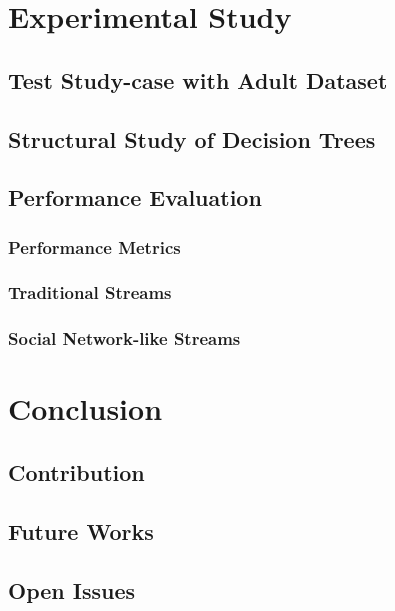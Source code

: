 \documentclass[a4paper, 11pt, oneside]{book}
\begin{document}
\chapter{Experimental Study}
\section{Test Study-case with Adult Dataset}
\section{Structural Study of Decision Trees}
\section{Performance Evaluation}
\subsection{Performance Metrics}
\subsection{Traditional Streams}
\subsection{Social Network-like Streams}

\chapter{Conclusion}
\section{Contribution}
\section{Future Works}
\section{Open Issues}



\end{document}
